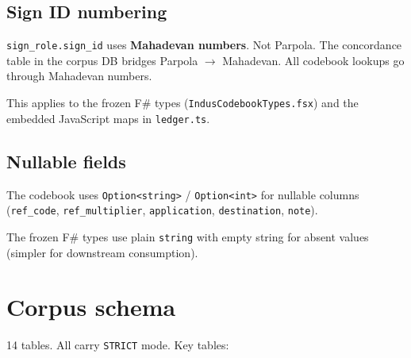 \documentclass[11pt]{article}
\begin{document}
\subsection{Sign ID numbering}

\texttt{sign\_role.sign\_id} uses \textbf{Mahadevan numbers}.
Not Parpola. The concordance table in the corpus DB bridges
Parpola $\to$ Mahadevan. All codebook lookups go through
Mahadevan numbers.

This applies to the frozen F\# types
(\texttt{IndusCodebookTypes.fsx}) and the embedded JavaScript
maps in \texttt{ledger.ts}.

\subsection{Nullable fields}

The codebook uses \texttt{Option<string>} / \texttt{Option<int>}
for nullable columns (\texttt{ref\_code},
\texttt{ref\_multiplier}, \texttt{application},
\texttt{destination}, \texttt{note}).

The frozen F\# types use plain \texttt{string} with empty
string for absent values (simpler for downstream consumption).

\section{Corpus schema}

14 tables. All carry \texttt{STRICT} mode. Key tables:
\end{document}
